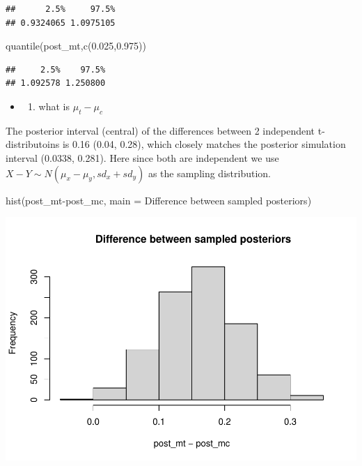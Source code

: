 \documentclass[
]{book}
\newenvironment{Shaded}{\begin{snugshade}}{\end{snugshade}}
\newcommand{\AttributeTok}[1]{\textcolor[rgb]{0.77,0.63,0.00}{#1}}
\newcommand{\FloatTok}[1]{\textcolor[rgb]{0.00,0.00,0.81}{#1}}
\newcommand{\FunctionTok}[1]{\textcolor[rgb]{0.00,0.00,0.00}{#1}}
\newcommand{\NormalTok}[1]{#1}
\newcommand{\SpecialCharTok}[1]{\textcolor[rgb]{0.00,0.00,0.00}{#1}}
\newcommand{\StringTok}[1]{\textcolor[rgb]{0.31,0.60,0.02}{#1}}
\providecommand{\tightlist}{%
  \setlength{\itemsep}{0pt}\setlength{\parskip}{0pt}}
\theoremstyle{definition}
\theoremstyle{definition}
\theoremstyle{definition}
\theoremstyle{definition}
\theoremstyle{remark}
\begin{document}
\begin{verbatim}
##      2.5%     97.5% 
## 0.9324065 1.0975105
\end{verbatim}

\begin{Shaded}
\begin{Highlighting}[]
        \FunctionTok{quantile}\NormalTok{(post\_mt,}\FunctionTok{c}\NormalTok{(}\FloatTok{0.025}\NormalTok{,}\FloatTok{0.975}\NormalTok{))}
\end{Highlighting}
\end{Shaded}

\begin{verbatim}
##     2.5%    97.5% 
## 1.092578 1.250800
\end{verbatim}

\begin{itemize}
\item
  \begin{enumerate}
  \def\labelenumi{(\alph{enumi})}
  \setcounter{enumi}{1}
  \tightlist
  \item
    what is \(\mu_t - \mu_c\)
  \end{enumerate}
\end{itemize}

The posterior interval (central) of the differences between 2 independent t-distributoins is 0.16 (0.04, 0.28), which closely matches the posterior simulation interval (0.0338, 0.281). Here since both are independent we use \(X-Y\sim N(\mu_x-\mu_y, sd_x+sd_y)\) as the sampling distribution.

\begin{Shaded}
\begin{Highlighting}[]
 \FunctionTok{hist}\NormalTok{(post\_mt}\SpecialCharTok{{-}}\NormalTok{post\_mc, }\AttributeTok{main =} \StringTok{\textquotesingle{} Difference between sampled posteriors\textquotesingle{}}\NormalTok{)}
\end{Highlighting}
\end{Shaded}

\includegraphics{_main_files/figure-latex/unnamed-chunk-32-1.pdf}
\end{document}
